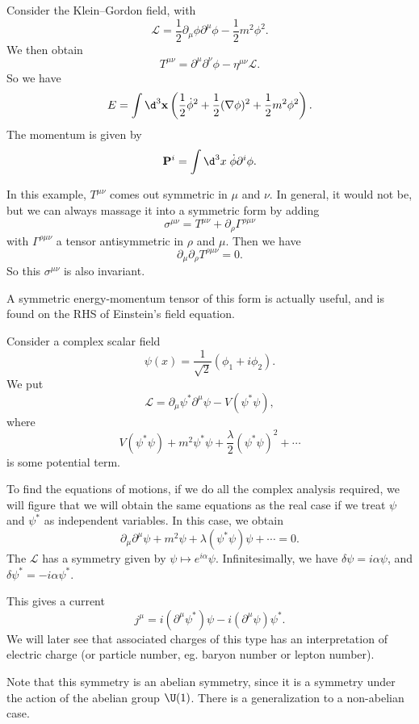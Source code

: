 \documentclass[a4paper]{article}
\begin{document}
\begin{eg}
  Consider the Klein--Gordon field, with
  \[
    \mathcal{L} = \frac{1}{2} \partial_\mu \phi \partial^\mu \phi - \frac{1}{2}m^2 \phi^2.
  \]
  We then obtain
  \[
    T^{\mu\nu} = \partial^\mu \partial^\nu \phi - \eta^{\mu\nu} \mathcal{L}.
  \]
  So we have
  \[
    E = \int \d^3 \mathbf{x} \left(\frac{1}{2}\dot{\phi}^2 + \frac{1}{2}(\nabla \phi)^2 + \frac{1}{2}m^2 \phi^2\right).
  \]
  The momentum is given by
  \[
    \mathbf{P}^i = \int\d^3 x\; \dot{\phi} \partial^i \phi.
  \]
\end{eg}
In this example, $T^{\mu\nu}$ comes out symmetric in $\mu$ and $\nu$. In general, it would not be, but we can always massage it into a symmetric form by adding
\[
  \sigma^{\mu\nu} = T^{\mu\nu} + \partial_\rho \Gamma^{\rho\mu\nu}
\]
with $\Gamma^{\rho\mu\nu}$ a tensor antisymmetric in $\rho$ and $\mu$. Then we have
\[
  \partial_\mu \partial_\rho T^{\rho\mu\nu} = 0.
\]
So this $\sigma^{\mu\nu}$ is also invariant.

A symmetric energy-momentum tensor of this form is actually useful, and is found on the RHS of Einstein's field equation.

\begin{eg}
  Consider a complex scalar field
  \[
    \psi(x) = \frac{1}{\sqrt{2}} (\phi_1 + i \phi_2).
  \]
  We put
  \[
    \mathcal{L} = \partial_\mu \psi^* \partial^\mu \psi - V(\psi^*\psi),
  \]
  where
  \[
    V (\psi^*\psi) + m^2 \psi^* \psi + \frac{\lambda}{2}(\psi^*\psi)^2 + \cdots
  \]
  is some potential term.

  To find the equations of motions, if we do all the complex analysis required, we will figure that we will obtain the same equations as the real case if we treat $\psi$ and $\psi^*$ as independent variables. In this case, we obtain
  \[
    \partial_\mu \partial^\mu \psi + m^2 \psi + \lambda (\psi^*\psi) \psi + \cdots = 0.
  \]
  The $\mathcal{L}$ has a symmetry given by $\psi \mapsto e^{i\alpha} \psi$. Infinitesimally, we have $\delta \psi = i\alpha \psi$, and $\delta \psi^* = -i\alpha \psi^*$.

  This gives a current
  \[
    j^\mu = i(\partial^\mu \psi^*) \psi - i (\partial^\mu \psi)\psi^*.
  \]
  We will later see that associated charges of this type has an interpretation of electric charge (or particle number, eg. baryon number or lepton number).
\end{eg}

Note that this symmetry is an abelian symmetry, since it is a symmetry under the action of the abelian group $\U(1)$. There is a generalization to a non-abelian case.
\end{document}
